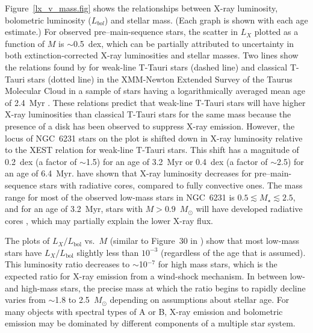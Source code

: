 \documentclass[twocolumn,tighten]{aastex61}
\begin{document}
Figure~\ref{lx_v_mass.fig} shows the relationships between X-ray luminosity, bolometric luminosity ($L_{bol}$) and stellar mass. (Each graph is shown with each age estimate.)  For observed pre--main-sequence stars, the scatter in $L_X$ plotted as a function of $M$ is $\sim$0.5~dex, which can be partially attributed to uncertainty in both extinction-corrected X-ray luminosities and stellar masses. Two lines show the relations found by  \citet{2007A&A...468..425T} for weak-line T-Tauri stars (dashed line) and classical T-Tauri stars (dotted line) in the XMM-Newton Extended Survey of the Taurus Molecular Cloud in a sample of stars having a logarithmically averaged mean age of 2.4~Myr \citep[XEST;][]{2007A&A...468..353G}. These relations predict that weak-line T-Tauri stars will have higher X-ray luminosities than classical T-Tauri stars for the same mass because the presence of a disk has been observed to suppress X-ray emission. However, the locus of NGC~6231 stars on the plot is shifted down in X-ray luminosity relative to the XEST relation for weak-line T-Tauri stars. This shift has a magnitude of 0.2~dex (a factor of $\sim$1.5) for an age of 3.2~Myr or 0.4~dex (a factor of $\sim$2.5) for an age of 6.4~Myr. \citet{2016MNRAS.457.3836G} have shown that X-ray luminosity decreases for pre--main-sequence stars with radiative cores, compared to fully convective ones. The mass range for most of the observed low-mass stars in NGC~6231 is $0.5\lesssim M_\star \lesssim 2.5$, and for an age of 3.2~Myr, stars with $M>0.9$~$M_\odot$ will have developed radiative cores \citep{2000A&A...358..593S}, which may partially explain the lower X-ray flux.

The plots of $L_X/L_\mathrm{bol}$ vs.\ $M$ (similar to Figure~30 in ) show that most low-mass stars have $L_X/L_\mathrm{bol}$ slightly less than $10^{-3}$ (regardless of the age that is assumed). This luminosity ratio decreases to $\sim$10$^{-7}$ for high mass stars, which is the expected ratio for X-ray emission from a wind-shock mechanism. In between low- and high-mass stars, the precise mass at which the ratio begins to rapidly decline varies from $\sim$1.8 to 2.5~$M_\odot$ depending on assumptions about stellar age. For many objects with spectral types of A or B, X-ray emission and bolometric emission may be dominated by different components of a multiple star system.
\end{document}

